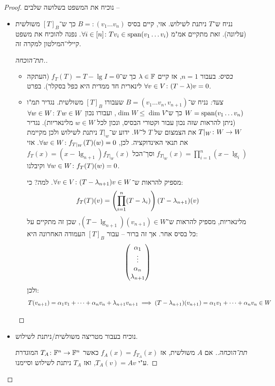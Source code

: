 \documentclass[name=רשימות אלגברה לינארית 2א]{../../../tex/classes/megasumPreamble}
\begin{document}
	\begin{proof}
		נוכיח את המשפט בשלושה שלבים – 
		\begin{itemize}
			\item נניח ש־$T$ ניתנת לשילוש. אזי, קיים בסיס $B =: (v_1 \dots v_n)$ כך ש־$[T]_B$ משולשית (עליונה). זאת מתקיים אמ"מ $\forall i \in [n] \colon Tv_i \in \operatorname{span}(v_1 \dots v_i)$. נפנה להוכיח את משפט קיילי־המילטון למקרה זה. 
			
			\begin{proof}[תת־הוכחה.]\,
				\begin{itemize}
					\item \textit{בסיס:} בעבור $n = 1$, אז קיים $\lambda \in \mathbb{F}$ כך ש־$f_T(T) = T - \lg I = 0$ (העתקה לינארית חד ממדית היא כפל בסקלר). בפרט $\forall v \in V \colon (T - \lambda)v = 0$. 
					\item \textit{צעד:} נניח ש־$B = (v_1 \dots v_n, v_{n + 1})$ שעבורו $[T]_B$ משולשית. נגדיר תמ"ו $W = \operatorname{span}(v_1 \dots v_n)$ כך ש־$\dim W \le \dim V$, ועבורו נכון $\forall w \in W \colon Tw \in W$ (ניתן להראות שזה נכון עבור וקטורי הבסיס, ונכון לכל $w \in W$ מלינאריות). נגדיר $T|_W \colon W \to W$ את הצמצום של $T$ ל־$W$. ידוע ש־$T|_w$ ניתנת לשילוש ולכן מקיימת את תנאי האינדוקציה. לכן, $\forall w \in W\colon f_{T|_W}(T)(w) = 0$. אזי $f_{T|_W}(x) = \prod_{i = 1}^{n}(x - \lg_i)$ וסך־הכל $f_{T}(x) = (x - \lg_{n + 1})f_{T|_W}(x)$ וקיבלנו $\forall w \in W \colon f_T(T)(w) = 0$. 
					
					מספיק להראות ש־$\forall v \in V \colon (T - \lambda_{n + 1})v \in W$. למה? כי: 
					\[ f_T(T)(v) = \left ( \prod_{i = 1}^{n}(T - \lambda_i) \right )(T - \lambda_{n + 1})(v) \]
					מלינאריות, מספיק להראות ש־$(T - \lg_{n + 1})(v_{n + 1})\in W$, שכן זה מתקיים על כל בסיס אחר. אך זה ברור – עבור $[T]_B$ העמודה האחרונה היא: 
					\[ \begin{pmatrix} \alpha_1 \\ \vdots \\ \alpha_n \\ \lambda_{n +1} \end{pmatrix} \]
					ולכן: 
					\[ T(v_{n + 1}) = \alpha_1 v_1 + \cdots + \alpha_n v_n + \lambda_{n + 1} v_{n + 1} \implies (T - \lambda_{n + 1})(v_{n + 1}) = \alpha_1v_1 + \cdots + \alpha_n v_n \in W \]
				\end{itemize}
			\end{proof}
			\item נוכיח בעבור מטריצה משולשית/ניתנת לשילוש. \begin{proof}[תת־הוכחה.]
				אם $A$ משולשית, אז $f_A(x) = f_{T_A}(x)$ כאשר $T_A \colon \mathbb{F}^n \to \mathbb{F}^n$ המוגדרת ע"י $T_A(v) = Av$, ואז $T_A$ ניתנת לשילוש וסיימנו. 
				

\end{proof}
\end{itemize}
\end{proof}
\end{document}
